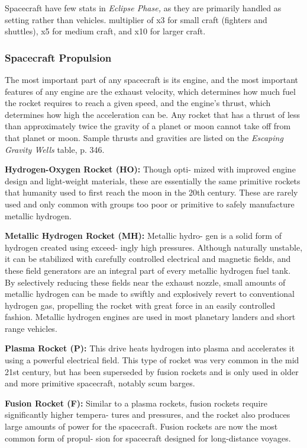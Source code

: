Spacecraft have few stats in \textit{Eclipse Phase,} as they 
are primarily handled as setting rather than vehicles. 
multiplier of x3 for small craft (fighters and shuttles), 
x5 for medium craft, and x10 for larger craft.

\subsubsection{Spacecraft Propulsion}

The most important part of any spacecraft is its engine, 
and the most important features of any engine are 
the exhaust velocity, which determines how much 
fuel the rocket requires to reach a given speed, and 
the engine's thrust, which determines how high the 
acceleration can be. Any rocket that has a thrust of 
less than approximately twice the gravity of a planet 
or moon cannot take off from that planet or moon. 
Sample thrusts and gravities are listed on the \textit{Escaping }
\textit{Gravity Wells} table, p. 346.

\textbf{Hydrogen-Oxygen Rocket (HO):} Though opti-
mized with improved engine design and light-weight 
materials, these are essentially the same primitive 
rockets that humanity used to first reach the moon 
in the 20th century. These are rarely used and only 
common with groups too poor or primitive to safely 
manufacture metallic hydrogen.

\textbf{Metallic Hydrogen Rocket (MH):} Metallic hydro-
gen is a solid form of hydrogen created using exceed-
ingly high pressures. Although naturally unstable, it 
can be stabilized with carefully controlled electrical 
and magnetic fields, and these field generators are 
an integral part of every metallic hydrogen fuel tank. 
By selectively reducing these fields near the exhaust 
nozzle, small amounts of metallic hydrogen can be 
made to swiftly and explosively revert to conventional 
hydrogen gas, propelling the rocket with great force 
in an easily controlled fashion. Metallic hydrogen 
engines are used in most planetary landers and short 
range vehicles.

\textbf{Plasma Rocket (P):} This drive heats hydrogen into 
plasma and accelerates it using a powerful electrical 
field. This type of rocket was very common in the 
mid 21st century, but has been superseded by fusion 
rockets and is only used in older and more primitive 
spacecraft, notably scum barges.

\textbf{Fusion Rocket (F):} Similar to a plasma rockets, 
fusion rockets require significantly higher tempera-
tures and pressures, and the rocket also produces 
large amounts of power for the spacecraft. Fusion 
rockets are now the most common form of propul-
sion for spacecraft designed for long-distance voyages.

